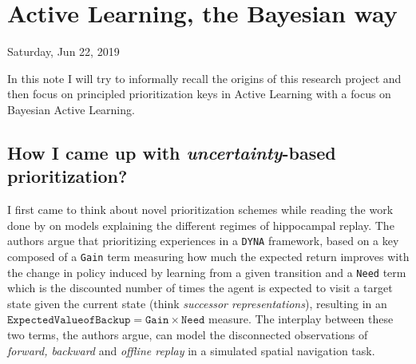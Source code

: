 \documentclass[10pt,a4paper]{article} %
\newcommand{\labday}[2]{\section{#2} \begin{flushright}#1\end{flushright}\bigskip}
\begin{document}
\pagestyle{plain}
\title{\rmfamily\normalfont{}}
\author{}
\date{} %

\maketitle
\begin{abstract}
    \noindent
    This document should work as a lab journal of sorts containing expositions
    of the ideas being tested, experimental results and their interpretation.
\end{abstract}
\tableofcontents



\labday{Saturday, Jun 22, 2019}{Active Learning, the Bayesian way}
\label{sec:bal}

\noindent
In this note I will try to informally recall the origins of this research
project and then focus on principled prioritization keys in Active Learning
with a focus on Bayesian Active Learning.


\subsection{How I came up with \textit{uncertainty}-based prioritization?}

I first came to think about novel prioritization schemes while reading the
work done by \cite{mattar2018prioritized} on models explaining the different
regimes of hippocampal replay. The authors argue that prioritizing
experiences in a \texttt{DYNA} framework, based on a key composed of a
\texttt{Gain} term measuring how much the expected return improves with the
change in policy induced by learning from a given transition and a
\texttt{Need} term which is the discounted number of times the agent is
expected to visit a target state given the current state (think
\textit{successor representations}), resulting in an
$\texttt{ExpectedValueofBackup} = \texttt{Gain} \times \texttt{Need}$ measure.
The interplay between these two terms, the authors argue, can model the
disconnected observations of \textit{forward, backward} and \textit{offline
replay} in a simulated spatial navigation task.
\end{document}
